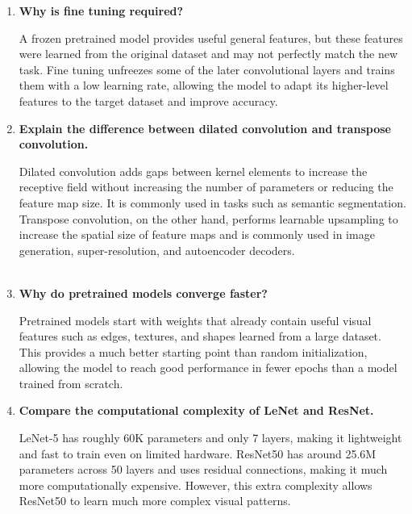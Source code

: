 \documentclass[11pt]{article}
\begin{document}
\begin{enumerate}
Transfer learning is the process of reusing a model trained on a large dataset, such as ImageNet, for a new but related task. Instead of training from scratch, the pretrained convolutional layers are kept because they already contain useful features such as edges, textures, and shapes, while a new classifier is trained for the target task.\
\\
\item \textbf{Why is fine tuning required?}

A frozen pretrained model provides useful general features, but these features were learned from the original dataset and may not perfectly match the new task. Fine tuning unfreezes some of the later convolutional layers and trains them with a low learning rate, allowing the model to adapt its higher-level features to the target dataset and improve accuracy.\
\\
\item \textbf{Explain the difference between dilated convolution and transpose convolution.}

Dilated convolution adds gaps between kernel elements to increase the receptive field without increasing the number of parameters or reducing the feature map size. It is commonly used in tasks such as semantic segmentation. Transpose convolution, on the other hand, performs learnable upsampling to increase the spatial size of feature maps and is commonly used in image generation, super-resolution, and autoencoder decoders.\\\\

\item \textbf{Why do pretrained models converge faster?}

Pretrained models start with weights that already contain useful visual features such as edges, textures, and shapes learned from a large dataset. This provides a much better starting point than random initialization, allowing the model to reach good performance in fewer epochs than a model trained from scratch.\
\\
\item \textbf{Compare the computational complexity of LeNet and ResNet.}

LeNet-5 has roughly 60K parameters and only 7 layers, making it lightweight and fast to train even on limited hardware. ResNet50 has around 25.6M parameters across 50 layers and uses residual connections, making it much more computationally expensive. However, this extra complexity allows ResNet50 to learn much more complex visual patterns.\\


\end{enumerate}
\end{document}
